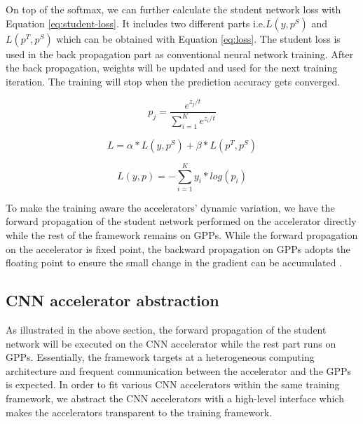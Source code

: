On top of the softmax, we can further calculate the student 
network loss with Equation \ref{eq:student-loss}. It includes 
two different parts i.e.$L(y, p^S)$ and $L(p^T, p^S)$ which can be 
obtained with Equation \ref{eq:loss}. The student loss is used in the 
back propagation part as conventional neural network training. 
After the back propagation, weights will be updated and used for the 
next training iteration. The training will stop when the prediction 
accuracy gets converged.

\begin{equation}
	\label{eq:pt-calu}
p_j=\frac{e^{{z_j}/t}}{\sum_{i=1}^{K}e^{{z_i}/t}}
\end{equation}

\begin{equation}
	\label{eq:student-loss}
L=\alpha*L(y,p^S)+\beta*L(p^T,p^S)
\end{equation}

\begin{equation}
	\label{eq:loss}
L(y,p)=-\sum_{i=1}^{K}y_i*log(p_i)
\end{equation}


To make the training aware the accelerators' dynamic variation, 
we have the forward propagation of the student network 
performed on the accelerator directly while the rest of the 
framework remains on GPPs. While the forward propagation on 
the accelerator is fixed point, the backward propagation on 
GPPs adopts the floating point to ensure 
the small change in the gradient can be accumulated \cite{Matthieu2014_8}. 


\subsection{CNN accelerator abstraction}
As illustrated in the above section, the forward propagation of the 
student network will be executed on the CNN accelerator while 
the rest part runs on GPPs. Essentially, the framework targets at a 
heterogeneous computing architecture and frequent 
communication between the accelerator and the GPPs is expected. 
In order to fit various CNN accelerators within the same training framework,
we abstract the CNN accelerators with a high-level interface
which makes the accelerators transparent to the training framework.

